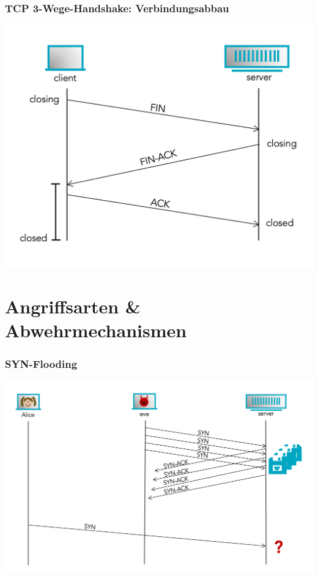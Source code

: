 \documentclass{beamer}
\begin{document}
\begin{frame}
	\frametitle{TCP 3-Wege-Handshake: Verbindungsabbau}
	\begin{center}
		\includegraphics[width=0.9\linewidth]{img/3}
	\end{center}
\end{frame}

\section{Angriffsarten \& Abwehrmechanismen}
\begin{frame}
	\frametitle{SYN-Flooding}
	\begin{center}
		\includegraphics[width=0.9\linewidth]{img/4}
	\end{center}
\end{frame}
\end{document}
